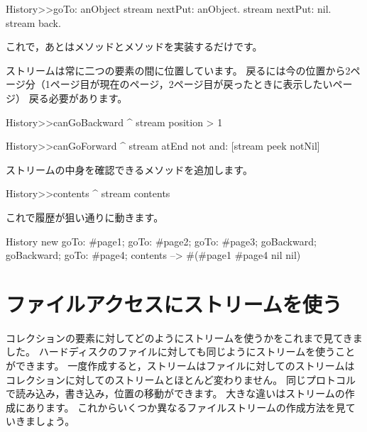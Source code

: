 \documentclass[a4paper,10pt,twoside]{book}
\begin{document}
\begin{code}{}
History>>goTo: anObject
  stream nextPut: anObject.
  stream nextPut: nil.
  stream back.
\end{code}

これで，あとはメソッドとメソッドを実装するだけです。

ストリームは常に二つの要素の間に位置しています。
戻るには今の位置から2ページ分（1ページ目が現在のページ，2ページ目が戻ったときに表示したいページ）
戻る必要があります。


\begin{code}{}
History>>canGoBackward
  ^ stream position > 1

History>>canGoForward
  ^ stream atEnd not and: [stream peek notNil]
\end{code}

ストリームの中身を確認できるメソッドを追加します。

\begin{code}{}
History>>contents
  ^ stream contents
\end{code}

これで履歴が狙い通りに動きます。

\begin{code}{}
History new
	goTo: #page1;
	goTo: #page2;
	goTo: #page3;
	goBackward;
	goBackward;
	goTo: #page4;
	contents --> #(#page1 #page4 nil nil)
\end{code}

\section{ファイルアクセスにストリームを使う}

コレクションの要素に対してどのようにストリームを使うかをこれまで見てきました。
ハードディスクのファイルに対しても同じようにストリームを使うことができます。
一度作成すると，ストリームはファイルに対してのストリームはコレクションに対してのストリームとほとんど変わりません。
同じプロトコルで読み込み，書き込み，位置の移動ができます。
大きな違いはストリームの作成にあります。
これからいくつか異なるファイルストリームの作成方法を見ていきましょう。
\end{document}
